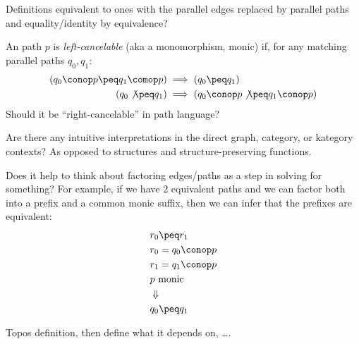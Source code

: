 \documentclass[11pt,openany]{book}
\begin{document}

Definitions equivalent to ones with the parallel
edges replaced by parallel paths and equality/identity 
by equivalence? 

An path $p$ is \textit{left-cancelable} (aka a monomorphism, monic)
if, for any matching parallel paths $q_0,q_1$:
\begin{align*}
\left( q_0 \conop p \peq q_1 \comop p \right) 
& 
\implies 
\left( q_0 \peq q_1 \right) 
\\
\left( q_0 \not\peq q_1 \right) 
& \implies 
\left( q_0 \conop p \not\peq q_1 \conop p \right) 
\end{align*}
Should it be ``right-cancelable'' in path language?


Are there any intuitive interpretations in the direct graph,
category, or kategory contexts? As opposed to 
structures and structure-preserving functions.

Does it help to think about factoring edges/paths
as a step in solving for something?
For example, if we have $2$ equivalent paths 
and we can factor both into a prefix and a common monic
suffix, then we can infer that the prefixes are equivalent:
\begin{align*}
& r_0 \peq r_1 \\
& r_0 = q_0 \conop p \\
& r_1 = q_1 \conop p \\
& p \text{ monic } \\
& \Downarrow \\
& q_0 \peq q_1
\end{align*}

\setcounter{currentlevel}{\value{baseSectionLevel}}
\label{sec:Topos-down}
 
Topos definition, then define what it depends on, \ldots.
 
\setcounter{currentlevel}{\value{baseSectionLevel}}
\label{sec:Fusion}
\end{document}
